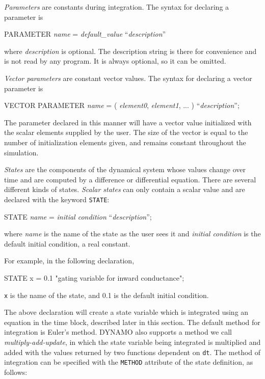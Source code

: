 \emph{Parameters} are constants during integration. The syntax 
for declaring a parameter is
\begin{example}
        PARAMETER \emph{name} = \emph{default\_value} ``\emph{description}''
\end{example}

where \emph{description} is optional. The description string is there
for convenience and is not read by any program. It is always optional,
so it can be omitted. 

\emph{Vector parameters} are constant vector values. The syntax  
for declaring a vector parameter is
\begin{example}
       VECTOR PARAMETER \emph{name} = ( \emph{element0}, \emph{element1}, ... ) ``\emph{description}'';
\end{example}

The parameter declared in this manner will have a vector value
initialized with the scalar elements supplied by the user. The size of
the vector is equal to the number of initialization elements given,
and remains constant throughout the simulation.

\emph{States} are the components of the dynamical system whose values
change over time and are computed by a difference or differential
equation.  There are several different kinds of states. \emph{Scalar
states} can only contain a scalar value and are declared with the
keyword \texttt{STATE}:

\begin{example}
        STATE \emph{name} = \emph{initial condition} ``\emph{description}'';
\end{example}

where \emph{name} is the name of the state as the user sees it and
\emph{initial condition} is the default initial condition, a real
constant.

For example, in the following declaration,

\begin{example}
        STATE x = 0.1 "gating variable for inward conductance";
\end{example}

\texttt{x} is the name of the state, and 0.1 is the default initial
condition.

The above declaration will create a state variable which is integrated
using an equation in the time block, described later in this
section. The default method for integration is Euler's method. DYNAMO
also supports a method we call \emph{multiply-add-update}, in which the
state variable being integrated is multiplied and added with the values
returned by two functions dependent on \texttt{dt}.  The method of
integration can be specified with the \texttt{METHOD} attribute of the
state definition, as follows:

